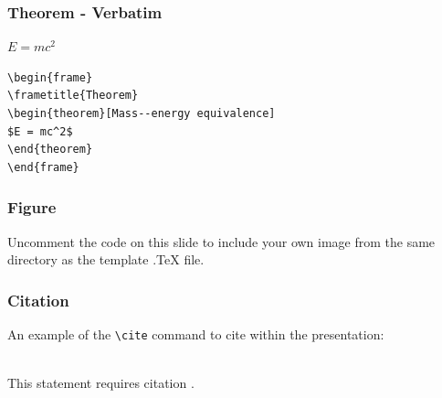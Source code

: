\documentclass{beamer}
\begin{document}

\begin{frame}[fragile] %
\frametitle{Theorem - Verbatim}

\begin{theorem}
$E = mc^2$
\end{theorem}

\begin{example}
\begin{verbatim}
\begin{frame}
\frametitle{Theorem}
\begin{theorem}[Mass--energy equivalence]
$E = mc^2$
\end{theorem}
\end{frame}\end{verbatim}
\end{example}
\end{frame}


\begin{frame}
\frametitle{Figure}
Uncomment the code on this slide to include your own image from the same directory as the template .TeX file.
\end{frame}


\begin{frame}[fragile] %
\frametitle{Citation}
An example of the \verb|\cite| command to cite within the presentation:\\~

This statement requires citation \cite{p1}.
\end{frame}
\end{document}
